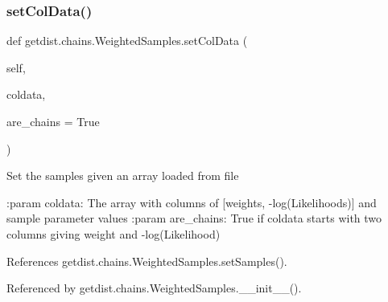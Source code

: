\mbox{\label{classgetdist_1_1chains_1_1WeightedSamples_a3d347a7823e4adc4e3f42bc5fd9a4162}} 
\subsubsection{\texorpdfstring{set\+Col\+Data()}{setColData()}}
{\footnotesize\ttfamily def getdist.\+chains.\+Weighted\+Samples.\+set\+Col\+Data (\begin{DoxyParamCaption}\item[{}]{self,  }\item[{}]{coldata,  }\item[{}]{are\+\_\+chains = {\ttfamily True} }\end{DoxyParamCaption})}

\begin{DoxyVerb}Set the samples given an array loaded from file

:param coldata: The array with columns of [weights, -log(Likelihoods)] and sample parameter values
:param are_chains: True if coldata starts with two columns giving weight and -log(Likelihood)
\end{DoxyVerb}
 

References getdist.\+chains.\+Weighted\+Samples.\+set\+Samples().



Referenced by getdist.\+chains.\+Weighted\+Samples.\+\_\+\+\_\+init\+\_\+\+\_\+().

